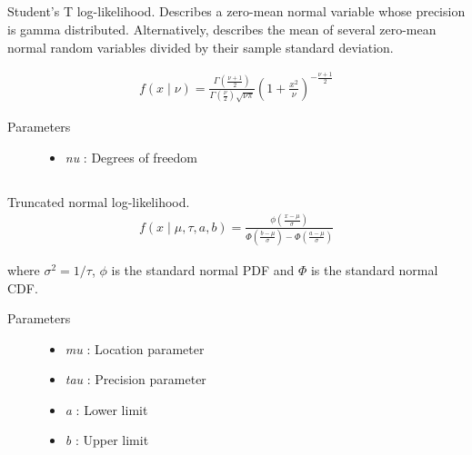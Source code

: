 \documentclass[]{jss}
\begin{document}
\subsection[Student's T]{ }

Student's T log-likelihood. Describes a zero-mean normal variable whose precision is
gamma distributed. Alternatively, describes the mean of several zero-mean normal
random variables divided by their sample standard deviation.

\begin{eqnarray*}
f(x \mid \nu) = \frac{\Gamma(\frac{\nu+1}{2})}{\Gamma(\frac{\nu}{2}) \sqrt{\nu\pi}} \left( 1 + \frac{x^2}{\nu} \right)^{-\frac{\nu+1}{2}}    
\end{eqnarray*}

\begin{description}
\item[Parameters] \leavevmode\begin{itemize}

\item {} 
\emph{nu} : Degrees of freedom

\end{itemize}

\end{description}

\subsection[truncated normal]{ }

Truncated normal log-likelihood.
\begin{eqnarray*}
f(x \mid \mu, \tau, a, b) = \frac{\phi(\frac{x-\mu}{\sigma})} {\Phi(\frac{b-\mu}{\sigma}) - \Phi(\frac{a-\mu}{\sigma})}    
\end{eqnarray*}

where $\sigma^2=1/\tau$, $\phi$ is the standard normal PDF and $\Phi$ is the standard normal CDF.
\begin{description}
\item[Parameters] \leavevmode\begin{itemize}

\item {} 
\emph{mu} : Location parameter

\item {} 
\emph{tau} : Precision parameter

\item {} 
\emph{a} : Lower limit

\item {} 
\emph{b} : Upper limit

\end{itemize}

\end{description}
\end{document}
